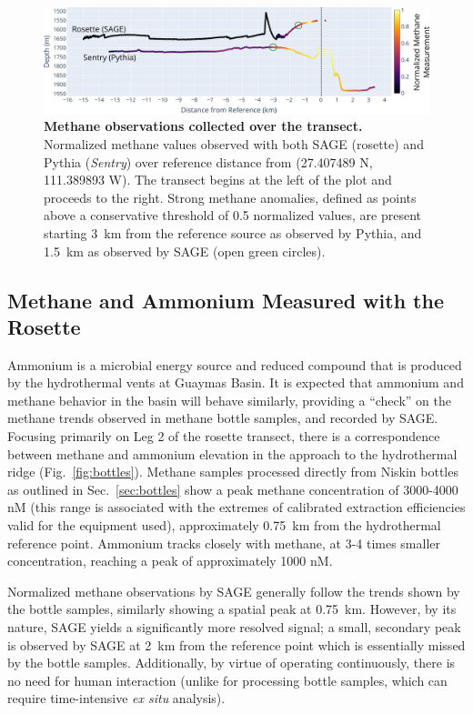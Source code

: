 \begin{figure}[h!]
    \centering
    \includegraphics[width=1\columnwidth]{figures/chap3_methane_over_distance.jpg}
    \caption[Methane observations collected over the transect]{\textbf{Methane observations collected over the transect.} Normalized methane values observed with both SAGE (rosette) and Pythia (\emph{Sentry}) over reference distance from (27.407489 N, 111.389893 W). The transect begins at the left of the plot and proceeds to the right. Strong methane anomalies, defined as points above a conservative threshold of 0.5 normalized values, are present starting \SI{3}{\kilo\meter} from the reference source as observed by Pythia, and \SI{1.5}{\kilo\meter} as observed by SAGE (open green circles).}
    \label{fig:methane_distance}
\end{figure}


\subsection{Methane and Ammonium Measured with the Rosette}
Ammonium is a microbial energy source and reduced compound that is produced by the hydrothermal vents at Guaymas Basin. It is expected that ammonium and methane behavior in the basin will behave similarly, providing a ``check'' on the methane trends observed in methane bottle samples, and recorded by SAGE. Focusing primarily on Leg 2 of the rosette transect, there is a correspondence between methane and ammonium elevation in the approach to the hydrothermal ridge (Fig.~\ref{fig:bottles}). Methane samples processed directly from Niskin bottles as outlined in Sec.~\ref{sec:bottles} show a peak methane concentration of 3000-4000 nM (this range is associated with the extremes of calibrated extraction efficiencies valid for the equipment used), approximately \SI{0.75}{\kilo\meter} from the hydrothermal reference point. Ammonium tracks closely with methane, at 3-4 times smaller concentration, reaching a peak of approximately 1000 nM. 

Normalized methane observations by SAGE generally follow the trends shown by the bottle samples, similarly showing a spatial peak at \SI{0.75}{\kilo\meter}. However, by its nature, SAGE yields a significantly more resolved signal; a small, secondary peak is observed by SAGE at \SI{2}{\kilo\meter} from the reference point which is essentially missed by the bottle samples. Additionally, by virtue of operating continuously, there is no need for human interaction (unlike for processing bottle samples, which can require time-intensive \emph{ex situ} analysis). 

